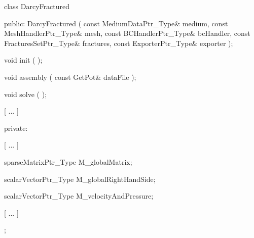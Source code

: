 \begin{Code03_04}[caption={Classe \texttt{DarcyFracture}}]
class DarcyFractured
{
 public:
    DarcyFractured ( const MediumDataPtr_Type& medium,
                     const MeshHandlerPtr_Type& mesh,
                     const BCHandlerPtr_Type& bcHandler,
                     const FracturesSetPtr_Type& fractures,
                     const ExporterPtr_Type& exporter );
    
    void init ( );
    
    void assembly ( const GetPot& dataFile );

    void solve ( );

	[ ... ]

 private:

	[ ... ]

    sparseMatrixPtr_Type M_globalMatrix;

    scalarVectorPtr_Type M_globalRightHandSide;

    scalarVectorPtr_Type M_velocityAndPressure;

    [ ... ]
};
\end{Code03_04}

